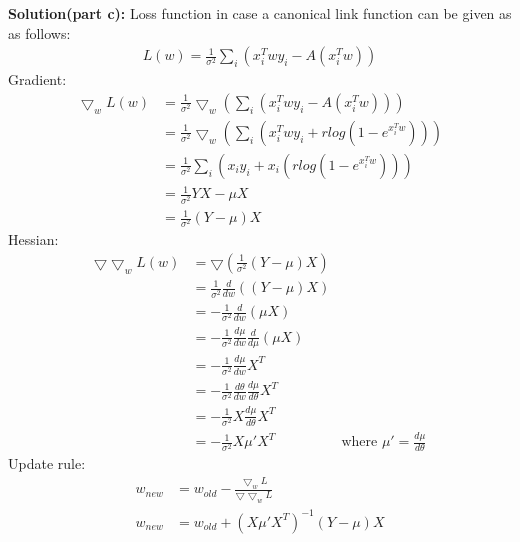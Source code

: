 \documentclass[10pt]{article}
\begin{document}
\newpage
\textbf{Solution(part c):} Loss function in case a canonical link function can be given as as follows:
\begin{align*}
L(w) = \frac{1}{\sigma^2} \sum_{i}^{}(x_i^Twy_i-A(x_i^Tw))
\end{align*}
Gradient:
\begin{align*}
\bigtriangledown_wL(w) &= \frac{1}{\sigma^2} \bigtriangledown_w (\sum_{i}^{}(x_i^Twy_i-A(x_i^Tw)))\\
&= \frac{1}{\sigma^2} \bigtriangledown_w (\sum_{i}^{}(x_i^Twy_i+rlog(1-e^{x_i^Tw})))\\
&= \frac{1}{\sigma^2} \sum_{i}^{}(x_iy_i + x_i(rlog(1-e^{x_i^Tw})))\\
&= \frac{1}{\sigma^2} YX - \mu X\\
&= \frac{1}{\sigma^2} (Y - \mu) X
\end{align*}
Hessian:
\begin{align*}
\bigtriangledown \bigtriangledown_wL(w) &= \bigtriangledown (\frac{1}{\sigma^2} (Y - \mu) X)\\
&= \frac{1}{\sigma^2} \frac{d}{dw}((Y-\mu)X)\\
&= -\frac{1}{\sigma^2} \frac{d}{dw}(\mu X)\\
&= -\frac{1}{\sigma^2} \frac{d\mu}{dw} \frac{d}{d\mu}(\mu X)\\
&= -\frac{1}{\sigma^2} \frac{d\mu}{dw} X^T\\
&= -\frac{1}{\sigma^2} \frac{d\theta}{dw}\frac{d\mu}{d\theta} X^T\\
&= -\frac{1}{\sigma^2} X\frac{d\mu}{d\theta} X^T\\
&= -\frac{1}{\sigma^2} X\mu' X^T & \text{where } \mu' = \frac{d\mu}{d\theta}
\end{align*}
Update rule:
\begin{align*}
w_{new} &= w_{old} - \frac{\bigtriangledown_wL}{\bigtriangledown \bigtriangledown_wL}\\
w_{new} &= w_{old} + (X\mu' X^T)^{-1} (Y-\mu)X
\end{align*}
\end{document}
